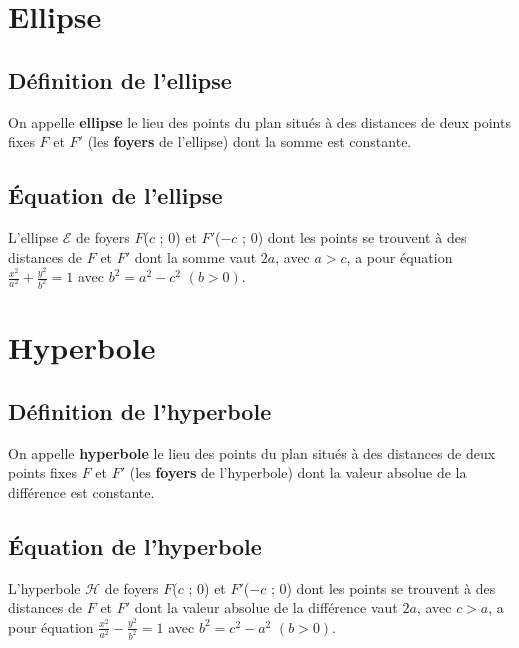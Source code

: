 \documentclass[11pt]{article}
\begin{document}
\newpage

\section{Ellipse}
\subsection{Définition de l'ellipse}
On appelle \textbf{ellipse} le lieu des points du plan situés à des distances de deux points fixes $F$ et $F'$ (les \textbf{foyers} de l'ellipse) dont la somme est constante.
\subsection{Équation de l'ellipse}
L'ellipse $\mathcal{E}$ de foyers $F$($c$ ; $0$) et $F'$($-c$ ; $0$) dont les points se trouvent à des distances de $F$ et $F'$ dont la somme vaut $2a$, avec $a>c$, a pour équation $\displaystyle \frac{x^2}{a^2} + \frac{y^2}{b^2} = 1$ avec $\displaystyle b^2=a^2-c^2$ $(b>0)$.

\newpage

\section{Hyperbole}
\subsection{Définition de l'hyperbole}
On appelle \textbf{hyperbole} le lieu des points du plan situés à des distances de deux points fixes $F$ et $F'$ (les \textbf{foyers} de l'hyperbole) dont la valeur absolue de la différence est constante.
\subsection{Équation de l'hyperbole}
L'hyperbole $\mathcal{H}$ de foyers $F$($c$ ; $0$) et $F'$($-c$ ; $0$) dont les points se trouvent à des distances de $F$ et $F'$ dont la valeur absolue de la différence vaut $2a$, avec $c>a$, a pour équation $\displaystyle \frac{x^2}{a^2} - \frac{y^2}{b^2} = 1$ avec $b^2=c^2-a^2$ $(b>0)$.
\end{document}
